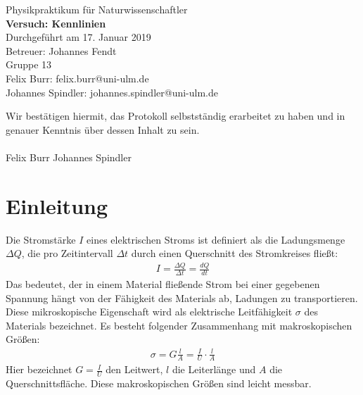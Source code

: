\documentclass{scrartcl}
\begin{document}
\begin{titlepage}
  \begin{center}
    \vspace*{1cm}
    \LARGE
    Physikpraktikum für Naturwissenschaftler \\
    \vspace*{1cm}
    \Huge
    \textbf{Versuch: Kennlinien} \\
    \vspace*{0.3cm}
    \Large
    Durchgeführt am 17. Januar 2019 \\
    Betreuer: Johannes Fendt \\
    \vspace*{2.5cm}
    Gruppe 13 \\
    Felix Burr: felix.burr@uni-ulm.de \\
    Johannes Spindler: johannes.spindler@uni-ulm.de \\
    \vfill 
  \end{center}
  Wir bestätigen hiermit, das Protokoll selbstständig erarbeitet zu haben und in genauer Kenntnis über dessen Inhalt zu sein. \\
  \vspace*{0.8cm}
  \\
  Felix Burr
  \hfill
  Johannes Spindler
\end{titlepage}
\pagebreak
\tableofcontents


\pagebreak

\section{Einleitung}
Die Stromstärke $I$ eines elektrischen Stroms ist definiert als die Ladungsmenge $\Delta Q$, die pro Zeitintervall $\Delta t$ durch einen Querschnitt des Stromkreises fließt:
\begin{align}
I = \frac{\Delta Q}{\Delta t} = \frac{dQ}{dt}
\end{align}
Das bedeutet, der in einem Material fließende Strom bei einer gegebenen Spannung hängt von der Fähigkeit des Materials ab, Ladungen zu transportieren. Diese mikroskopische Eigenschaft wird als elektrische Leitfähigkeit $\sigma$ des Materials bezeichnet. Es besteht folgender Zusammenhang mit makroskopischen Größen:
\begin{align}
\sigma = G \frac{l}{A} = \frac{I}{U} \cdot \frac{l}{A}
\end{align}
Hier bezeichnet $G = \frac{I}{U}$ den Leitwert, $l$ die Leiterlänge und $A$ die Querschnittsfläche. Diese makroskopischen Größen sind leicht messbar.
\end{document}

